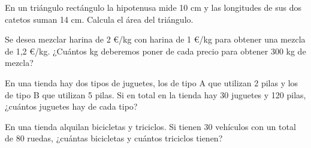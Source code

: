 \begin{ejer}
En un triángulo rectángulo la hipotenusa mide 10 cm y las longitudes de sus dos catetos suman 14 cm. Calcula el área del triángulo.
\end{ejer}

\begin{ejer}
Se desea mezclar harina de 2 €/kg con harina de 1 €/kg para obtener una mezcla de 1,2 €/kg. ¿Cuántos kg deberemos poner de cada precio para obtener 300 kg de mezcla?
\end{ejer}

\begin{ejer}
En una tienda hay dos tipos de juguetes, los de tipo A que utilizan 2 pilas y los de tipo B que utilizan 5 pilas. Si en total en la tienda hay 30 juguetes y 120 pilas, ¿cuántos juguetes hay de cada tipo?
\end{ejer}

\begin{ejer}
En una tienda alquilan bicicletas y triciclos. Si tienen 30 vehículos con un total de 80 ruedas, ¿cuántas bicicletas y cuántos triciclos tienen?
\end{ejer}



